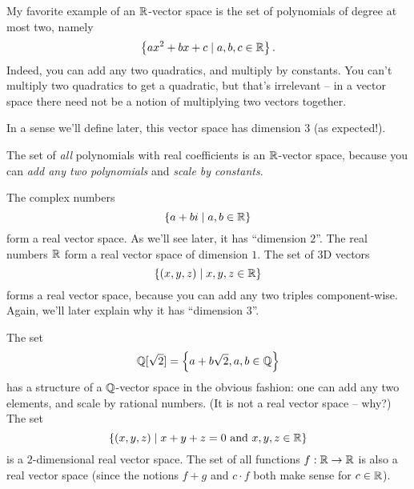 \begin{example}
	My favorite example of an $\mathbb R$-vector space is the
	set of polynomials of degree at most two, namely
	\[ \left\{ ax^2+bx+c \mid a,b,c \in \mathbb R \right\}. \]
	Indeed, you can add any two quadratics, and multiply by constants.
	You can't multiply two quadratics to get a quadratic,
	but that's irrelevant -- in a vector space there need not
	be a notion of multiplying two vectors together.

	In a sense we'll define later, this vector space
	has dimension $3$ (as expected!).
	\label{example:quadratic_vector_space}
\end{example}
\begin{example}
	The set of \emph{all} polynomials with real coefficients is an
	$\mathbb R$-vector space, because you can \emph{add any two polynomials}
	and \emph{scale by constants}.
\end{example}

\begin{example}
	\listhack
	\begin{enumerate}[(a)]
		\ii The complex numbers
		\[ \left\{ a+bi \mid a,b \in \mathbb R \right\} \]
		form a real vector space. As we'll see later,
		it has ``dimension $2$''.
		\ii The real numbers $\mathbb R$ form a real vector space of dimension $1$.
		\ii The set of 3D vectors
		\[ \left\{ (x,y,z) \mid x,y,z \in \mathbb R \right\} \]
		forms a real vector space, because you can add any two triples
		component-wise. Again, we'll later explain
		why it has ``dimension $3$''.
	\end{enumerate}
\end{example}

\begin{example}
	\listhack
	\begin{enumerate}[(a)]
		\ii The set \[ \mathbb Q[\sqrt 2] = \left\{ a + b \sqrt 2 , a, b \in \mathbb Q \right\} \]
		has a structure of a $\mathbb Q$-vector space in the obvious fashion:
		one can add any two elements, and scale by rational numbers.
		(It is not a real vector space -- why?)
		\ii The set \[ \left\{ (x,y,z) \mid x+y+z = 0 \text{ and } x,y,z \in \mathbb R \right\} \]
		is a $2$-dimensional real vector space.
		\ii The set of all functions $f : \mathbb R \to \mathbb R$ is also a real vector space
		(since the notions $f+g$ and $c \cdot f$ both make sense for $c \in \mathbb R$).
	\end{enumerate}
\end{example}

